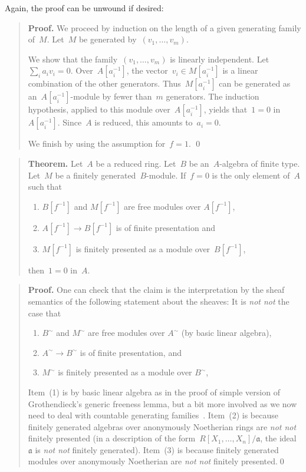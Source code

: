 \documentclass{ws-rv9x6}
\newcommand{\aaa}{\mathfrak{a}}
\renewcommand{\_}{\mathpunct{.}}
\newcommand{\?}{\,{:}\,}
\newcommand{\notnot}{\emph{not not}\xspace}
\begin{document}
Again, the proof can be unwound if desired:

\begin{quote}\textbf{Proof.}
We proceed by induction on the length of a given generating family
of~$M$. Let~$M$ be generated by~$(v_1,\ldots,v_m)$.

We show that the family~$(v_1,\ldots,v_m)$ is linearly independent. Let~$\sum_i
a_i v_i = 0$. Over~$A[a_i^{-1}]$, the vector~$v_i \in M[a_i^{-1}]$ is a linear
combination of the other generators. Thus~$M[a_i^{-1}]$ can be generated as
an~$A[a_i^{-1}]$-module by fewer than~$m$ generators. The induction hypothesis,
applied to this module over~$A[a_i^{-1}]$, yields that~$1 = 0$ in~$A[a_i^{-1}]$. Since~$A$ is
reduced, this amounts to~$a_i = 0$.

We finish by using the assumption for~$f = 1$. \qed
\end{quote}


\begin{quote}
\textbf{Theorem.}
Let~$A$ be a reduced ring. Let~$B$ be an~$A$-algebra of finite type. Let~$M$ be
a finitely generated~$B$-module.
If~$f = 0$ is the only element of~$A$ such that
\begin{enumerate}
\item $B[f^{-1}]$ and $M[f^{-1}]$ are free modules over $A[f^{-1}]$,
\item $A[f^{-1}] \to B[f^{-1}]$ is of finite presentation and
\item $M[f^{-1}]$ is finitely presented as a module over~$B[f^{-1}]$,
\end{enumerate}
then~$1 = 0$ in~$A$.
\end{quote}

\begin{quote}\textbf{Proof.} One can check that the claim is the interpretation by the sheaf
semantics of the following statement about the sheaves: It is \notnot the case that
\begin{enumerate}
  \item $B^\sim$ and $M^\sim$ are free modules over $A^\sim$ (by basic linear algebra),
  \item $A^\sim \to B^\sim$ is of finite presentation, and
  \item $M^\sim$ is finitely presented as a module over $B^\sim$,
\end{enumerate}

Item~(1) is by basic linear algebra as in the proof of
simple version of Grothendieck's generic freeness lemma, but a bit more involved as we now need to
deal with countable generating
families~\cite[Theorem~11.16]{blechschmidt:phd}. Item~(2) is because finitely
generated algebras over anonymously Noetherian rings are \notnot finitely
presented (in a description of the form~$R[X_1,\ldots,X_n]/\aaa$, the
ideal~$\aaa$ is \notnot finitely generated).
Item~(3) is because finitely generated modules over anonymously Noetherian are
\notnot finitely presented.\qed
\end{quote}
\end{document}
